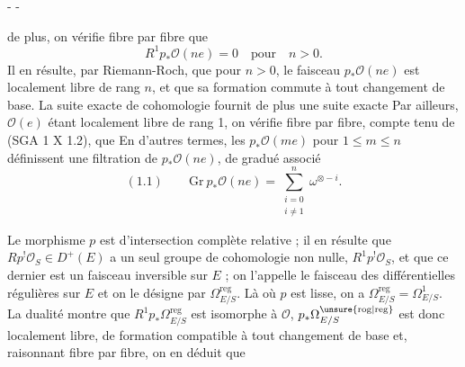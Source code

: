 -  -

de plus, on vérifie fibre par fibre que
\[
R^1p_*\mathcal O(ne)=0\quad\text{pour}\quad n>0.
\]
Il en résulte, par Riemann-Roch, que pour $n>0$, le faisceau $p_*\mathcal O(ne)$ est localement libre de rang $n$, et que sa formation commute à tout changement de base. La suite exacte de cohomologie fournit de plus une suite exacte
Par ailleurs, $\mathcal O(e)$ étant localement libre de rang 1, on vérifie fibre par fibre, compte tenu de (SGA 1 X 1.2), que
En d'autres termes, les $p_*\mathcal O(me)$ pour $1\leq m\leq n$ définissent une filtration de $p_*\mathcal O(ne)$, de gradué associé
\[
(1.1)\qquad \mathrm{Gr}\ p_*\mathcal O(ne)=\sum_{\substack{i=0\\i\ne1}}^n\omega^{\otimes-i}.
\]

Le morphisme $p$ est d'intersection complète relative ; il en résulte que $Rp^!\mathcal O_S\in D^+(E)$ \inserted{\unsure{$\rho$}} a un seul groupe de cohomologie non nulle, $R^1p^!\mathcal O_S$, et que ce dernier est un faisceau inversible sur $E$ ; on l'appelle le faisceau des différentielles régulières sur $E$ et on le désigne par $\Omega^{\mathrm{reg}}_{E/S}$. Là où $p$ est lisse, on a $\Omega^{\mathrm{reg}}_{E/S}=\Omega^1_{E/S}$. La dualité montre que $R^1p_*\Omega^{\mathrm{reg}}_{E/S}$ est isomorphe à $\mathcal O$, $p_*\Omega^{\unsure{\mathrm{rog}|\mathrm{reg}}}_{E/S}$ est donc\inserted{\unsure{$\rho$}} localement libre, de formation compatible à tout changement de base et, raisonnant fibre par fibre, on en déduit que
